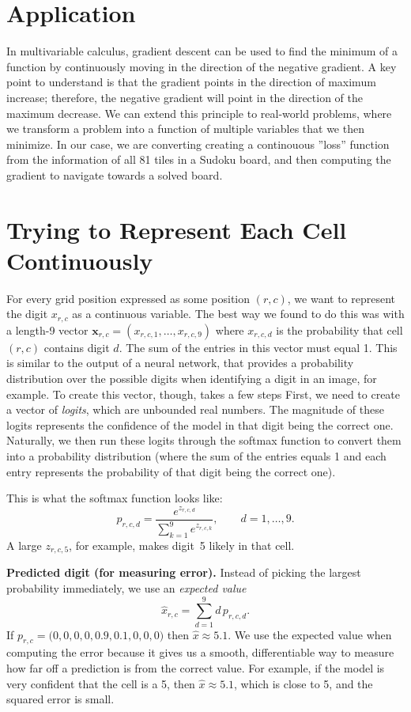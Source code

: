 \documentclass[12pt]{article}
\begin{document}
\section*{Application}

In multivariable calculus, gradient descent can be used to find the minimum of a function by continuously moving in the direction of the negative gradient. A key point to understand is that the gradient points in the direction of maximum increase; therefore, the negative gradient will point in the direction of the maximum decrease. We can extend this principle to real-world problems, where we transform a problem into a function of multiple variables that we then minimize.
In our case, we are converting creating a continouous ''loss'' function from the information of all 81 tiles in a Sudoku board, and then computing the gradient to navigate towards a solved board.
\section{Trying to Represent Each Cell Continuously}

For every grid position expressed as some position $(r,c)$, we want to represent the digit $x_{r,c}$ as a continuous variable. The best way we found to do this was with a length-9 vector $\mathbf x_{r,c}=(x_{r,c,1},\dots,x_{r,c,9})$ where $x_{r,c,d}$ is the probability that cell $(r,c)$ contains digit $d$. The sum of the entries in this vector must equal 1. This is similar to the output of a neural network, that provides a probability distribution over the possible digits when identifying a digit in an image, for example. 
To create this vector, though, takes a few steps
First, we need to create a vector of \textit{logits}, which are unbounded real numbers. The magnitude of these logits represents the confidence of the model in that digit being the correct one. Naturally, we then run these logits through the softmax function to convert them into a probability distribution (where the sum of the entries equals 1 and each entry represents the probability of that digit being the correct one).

This is what the softmax function looks like:
\begin{equation}
    p_{r,c,d} = \frac{e^{z_{r,c,d}}}{\sum_{k=1}^{9}e^{z_{r,c,k}}}, \qquad d=1,\dots,9.
\end{equation}
A large $z_{r,c,5}$, for example, makes digit~5 likely in that cell.

\textbf{Predicted digit (for measuring error).}
Instead of picking the largest probability immediately, we use an \emph{expected value}
\begin{equation}
    \hat x_{r,c} = \sum_{d=1}^{9}d\,p_{r,c,d}.
\end{equation}
If $p_{r,c}=\bigl(0,0,0,0,0.9,0.1,0,0,0\bigr)$ then $\hat x\approx5.1$. We use the expected value when computing the error because it gives us a smooth, differentiable way to measure how far off a prediction is from the correct value.
For example, if the model is very confident that the cell is a 5, then $\hat{x} \approx 5.1$, which is close to 5, and the squared error is small.
\end{document}

